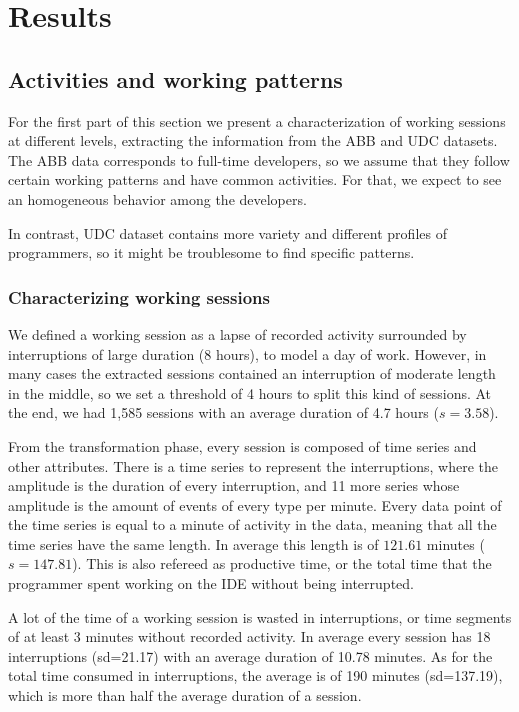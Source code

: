 \chapter{Results}
\label{ch:intro}

\section{Activities and working patterns}
For the first part of this section we present a characterization of working sessions at different levels, extracting the information from the ABB and UDC datasets. The ABB data corresponds to full-time developers, so we assume that they follow certain working patterns and have common activities. For that, we expect to see an homogeneous behavior among the developers.

In contrast, UDC dataset contains more variety and different profiles of programmers, so it might be troublesome to find specific patterns.

\subsection{Characterizing working sessions}
We defined a working session as a lapse of recorded activity surrounded by interruptions of large duration (8 hours), to model a day of work. However, in many cases the extracted sessions contained an interruption of moderate length in the middle, so we set a threshold of 4 hours to split this kind of sessions. At the end, we had 1,585 sessions with an average duration of 4.7 hours ($s=3.58$).

From the transformation phase, every session is composed of time series and other attributes. There is a time series to represent the interruptions, where the amplitude is the duration of every interruption, and 11 more series whose amplitude is the amount of events of every type per minute. Every data point of the time series is equal to a minute of activity in the data, meaning that all the time series have the same length. In average this length is of $121.61$ minutes ($s=147.81$). This is also refereed as productive time, or the total time that the programmer spent working on the IDE without being interrupted.

A lot of the time of a working session is wasted in interruptions, or time segments of at least 3 minutes without recorded activity. In average every session has 18 interruptions (sd=21.17) with an average duration of 10.78 minutes. As for the total time consumed in interruptions, the average is of 190 minutes (sd=137.19), which is more than half the average duration of a session.

